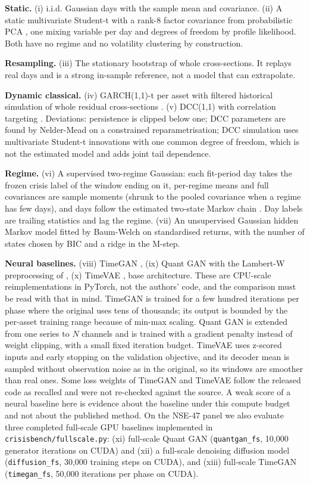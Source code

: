 \documentclass[journal]{IEEEtran}
\begin{document}
\textbf{Static.} (i) i.i.d. Gaussian days with the sample mean and covariance. (ii) A static multivariate
Student-t with a rank-8 factor covariance from probabilistic PCA \cite{tipping1999ppca}, one mixing variable
per day and degrees of freedom by profile likelihood. Both have no regime and no volatility clustering by
construction.

\textbf{Resampling.} (iii) The stationary bootstrap \cite{politis1994stationary} of whole cross-sections. It
replays real days and is a strong in-sample reference, not a model that can extrapolate.

\textbf{Dynamic classical.} (iv) GARCH(1,1)-t per asset with filtered historical simulation of whole residual
cross-sections \cite{bollerslev1986garch,baroneadesi1999fhs}. (v) DCC(1,1) with correlation targeting
\cite{engle2002dcc}. Deviations: persistence is clipped below one; DCC parameters are found by Nelder-Mead on a
constrained reparametrisation; DCC simulation uses multivariate Student-t innovations with one common degree
of freedom, which is not the estimated model and adds joint tail dependence.

\textbf{Regime.} (vi) A supervised two-regime Gaussian: each fit-period day takes the frozen crisis label of
the window ending on it, per-regime means and full covariances are sample moments (shrunk to the pooled
covariance when a regime has few days), and days follow the estimated two-state Markov chain
\cite{hamilton1989regime}. Day labels are trailing statistics and lag the regime. (vii) An unsupervised
Gaussian hidden Markov model \cite{rabiner1989hmm} fitted by Baum-Welch on standardised returns, with the
number of states chosen by BIC and a ridge in the M-step.

\textbf{Neural baselines.} (viii) TimeGAN \cite{yoon2019timegan}, (ix) Quant GAN \cite{wiese2020quantgans} with
the Lambert-W preprocessing of \cite{goerg2015lambert}, (x) TimeVAE \cite{desai2021timevae}, base architecture.
These are CPU-scale reimplementations in PyTorch, not the authors' code, and the comparison must be read with
that in mind. TimeGAN is trained for a few hundred iterations per phase where the original uses tens of
thousands; its output is bounded by the per-asset training range because of min-max scaling. Quant GAN is
extended from one series to $N$ channels and is trained with a gradient penalty instead of weight clipping,
with a small fixed iteration budget. TimeVAE uses z-scored inputs and early stopping on the validation
objective, and its decoder mean is sampled without observation noise as in the original, so its windows are
smoother than real ones. Some loss weights of TimeGAN and TimeVAE follow the released code as recalled and were
not re-checked against the source. A weak score of a neural baseline here is evidence about the baseline under
this compute budget and not about the published method. On the NSE-47 panel we also evaluate three completed
full-scale GPU baselines implemented in \texttt{crisisbench/fullscale.py}: (xi) full-scale Quant GAN
(\texttt{quantgan\_fs}, 10{,}000 generator iterations on CUDA) and (xii) a full-scale denoising diffusion model (\texttt{diffusion\_fs}, 30{,}000 training steps on CUDA), and (xiii) full-scale TimeGAN (\texttt{timegan\_fs}, 50{,}000 iterations per phase on CUDA).
\end{document}
